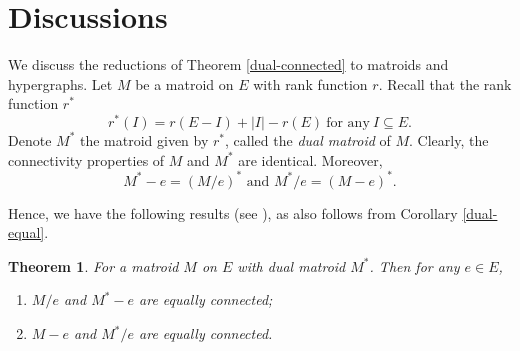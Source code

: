 \documentclass[preprint,10pt]{elsarticle}
\theoremstyle{plain}
\newtheorem{theorem}{Theorem}[section]
\theoremstyle{definition}
\theoremstyle{remark}
\begin{document}
\section{Discussions}

We discuss the reductions of Theorem \ref{dual-connected} to matroids and hypergraphs. Let $M$ be a matroid on $E$ with rank function $r$. Recall that the rank function $r^*$
\begin{equation}\label{dual-rank1}
r^*(I) = r(E-I) + |I| - r(E) ~\text{for any}~I\subseteq E.
\end{equation}
 Denote $M^*$ the matroid given by  $r^*$, called the \emph{dual matroid} of $M$. Clearly, the connectivity properties of $M$ and $M^*$ are identical. Moreover,
\begin{equation*}
M^*-e = (M/e)^* \text{~and~} M^* /e = (M-e)^*.
\end{equation*}

Hence, we have the following results (see \cite{Oxley1}), as also follows from Corollary \ref{dual-equal}.
\begin{theorem}\label{dual-equal1}
For a matroid $M$ on $E$ with dual matroid $M^*$.  Then for any $e\in E$,
\begin{enumerate}
\item [(1)] $M/e$ and $M^*-e$ are equally connected;
\item [(2)] $M-e$ and $M^*/e$ are equally connected.
\end{enumerate}
\end{theorem}
\end{document}
